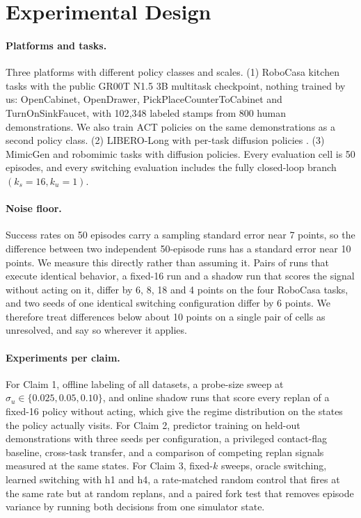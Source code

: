 \section{Experimental Design}

\paragraph{Platforms and tasks.}
Three platforms with different policy classes and scales.
(1) RoboCasa kitchen tasks \citep{nasiriany2024robocasa} with the public GR00T
N1.5 3B multitask checkpoint, nothing trained by us: OpenCabinet, OpenDrawer,
PickPlaceCounterToCabinet and TurnOnSinkFaucet, with 102{,}348 labeled stamps
from 800 human demonstrations. We also train ACT policies
\citep{zhao2023act} on the same demonstrations as a second policy class.
(2) LIBERO-Long \citep{liu2023libero} with per-task diffusion policies
\citep{chi2023diffusion}.
(3) MimicGen \citep{mandlekar2023mimicgen} and robomimic tasks with diffusion
policies. Every evaluation cell is 50 episodes, and every switching evaluation
includes the fully closed-loop branch $(k_s{=}16, k_u{=}1)$.

\paragraph{Noise floor.}
Success rates on 50 episodes carry a sampling standard error near 7 points, so
the difference between two independent 50-episode runs has a standard error
near 10 points. We measure this directly rather than assuming it. Pairs of runs
that execute identical behavior, a fixed-16 run and a shadow run that scores
the signal without acting on it, differ by 6, 8, 18 and 4 points on the four
RoboCasa tasks, and two seeds of one identical switching configuration differ
by 6 points. We therefore treat differences below about 10 points on a single
pair of cells as unresolved, and say so wherever it applies.

\paragraph{Experiments per claim.}
For Claim 1, offline labeling of all datasets, a probe-size sweep at
$\sigma_u \in \{0.025, 0.05, 0.10\}$, and online shadow runs that score every
replan of a fixed-16 policy without acting, which give the regime distribution
on the states the policy actually visits.
For Claim 2, predictor training on held-out demonstrations with three seeds per
configuration, a privileged contact-flag baseline, cross-task transfer, and a
comparison of competing replan signals measured at the same states.
For Claim 3, fixed-$k$ sweeps, oracle switching, learned switching with h1 and
h4, a rate-matched random control that fires at the same rate but at random
replans, and a paired fork test that removes episode variance by running both
decisions from one simulator state.
